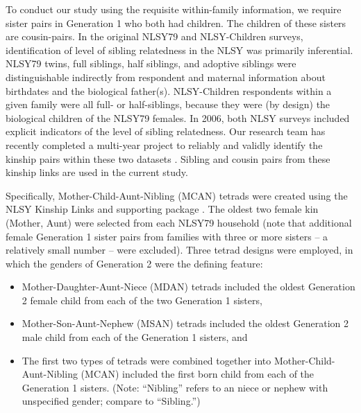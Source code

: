 To conduct our study using the requisite within-family information, we require sister pairs in Generation 1 who both had children. The children of these sisters are cousin-pairs. In the original NLSY79 and NLSY-Children surveys, identification of level of sibling relatedness in the NLSY was primarily inferential. NLSY79 twins, full siblings, half siblings, and adoptive siblings were distinguishable indirectly from respondent and maternal information about birthdates and the biological father(s). NLSY-Children respondents within a given family were all full- or half-siblings, because they were (by design) the biological children of the NLSY79 females. In 2006, both NLSY surveys included explicit indicators of the level of sibling relatedness. Our research team has recently completed a multi-year project to reliably and validly identify the kinship pairs within these two datasets \citep{nlsylinksbgpaper}. Sibling and cousin pairs from these kinship links are used in the current study.

Specifically, Mother-Child-Aunt-Nibling (MCAN) tetrads were created using the NLSY Kinship Links \citep{nlsylinksbgpaper} and supporting \R package \citep{nlsylinksr}. The oldest two female kin (Mother, Aunt) were selected from each NLSY79 household (note that additional female Generation 1 sister pairs from families with three or more sisters -- a relatively small number -- were excluded). Three tetrad designs were employed, in which the genders of Generation 2 were the defining feature: 
\begin{itemize}\item Mother-Daughter-Aunt-Niece (MDAN) tetrads included the oldest Generation 2 female child from each of the two Generation 1 sisters, 
\item Mother-Son-Aunt-Nephew (MSAN) tetrads included the oldest Generation 2 male child from each of the Generation 1 sisters, and 
\item The first two types of tetrads were combined together into Mother-Child-Aunt-Nibling (MCAN) included the first born child from each of the Generation 1 sisters. (Note: ``Nibling'' refers to an niece or nephew with unspecified gender; compare to ``Sibling.'')\end{itemize} 
